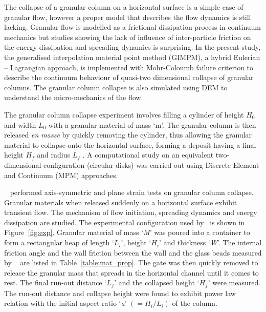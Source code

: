 The collapse of a granular column on a horizontal surface is a simple case of 
granular flow, however a proper model that describes the flow dynamics is still
lacking. Granular flow is modelled as a frictional dissipation process in 
continuum mechanics but studies showing the lack of influence of inter-particle 
friction on the energy dissipation and spreading dynamics is surprising. 
In the present study, the generalised interpolation material point method 
(GIMPM), a hybrid Eulerian -- Lagrangian approach, is implemented with 
Mohr-Coloumb failure criterion to describe the continuum behaviour of quasi-two 
dimensional collapse of granular columns. The granular column collapse is also 
simulated using DEM to understand the micro-mechanics of the flow.

The granular column collapse experiment involves filling a cylinder of height 
$H_0$ and width $L_0$ with a granular material of mass `m'. The granular column 
is then released \textit{en masse} by quickly removing the cylinder, thus 
allowing the granular material to collapse onto the horizontal surface, forming 
a deposit having a final height $H_f$ and radius $L_f$ . A computational study 
on an equivalent two-dimensional configuration (circular disks) was carried out 
using Discrete Element and Continuum (MPM) approaches.

~\citet{Lajeunesse2004} performed axis-symmetric and plane strain tests on 
granular column collapse. Granular materials when released suddenly on a 
horizontal surface exhibit transient flow. The mechanism of flow initiation, 
spreading dynamics and energy dissipation are studied. The experimental 
configuration used by~\citet{Lajeunesse2004} is shown in Figure~\ref{fig:exp}. 
Granular material of mass `\textit{M}' was poured into a container to form a 
rectangular heap of length `${L}_{\textit{i}}$', height `${H}_{\textit{i}}$' 
and thickness `\textit{W}'. The internal friction angle and the wall friction 
between the wall and the glass beads measured by ~\citet{Lajeunesse2004} are 
listed in Table~\ref{table:mat_prop}. The gate was then quickly removed to 
release the granular mass that spreads in the horizontal channel until it comes 
to rest. The final run-out distance `${L}_{\textit{f}}$' and the collapsed 
height `$H_{\textit{f}}$' were measured. The run-out distance and collapse 
height were found to exhibit power law relation with the initial aspect ratio 
`\textit{a}' $(=H_{\textit{i}}/L_{\textit{i}})$ of the column. 

